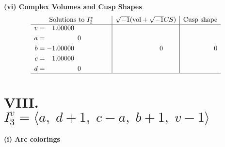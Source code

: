 \documentclass[1p]{elsarticle_modified}
\theoremstyle{definition}
\newcommand{\I}{\sqrt{-1}}
\begin{document}
\newpage\flushleft \textbf{(vi) Complex Volumes and Cusp Shapes}
$$\begin{array}{c|c|c}  
\text{Solutions to }I^v_{2}& \I (\text{vol} + \sqrt{-1}CS) & \text{Cusp shape}\\
 \hline 
\begin{aligned}
v &= \phantom{-}1.00000\phantom{ +0.000000I} \\
a &= \phantom{-0.000000 } 0 \\
b &= -1.00000\phantom{ +0.000000I} \\
c &= \phantom{-}1.00000\phantom{ +0.000000I} \\
d &= \phantom{-0.000000 } 0\end{aligned}
 & \phantom{-0.000000 } 0 & \phantom{-0.000000 } 0\\
 \hline 
 \end{array}$$\newpage\newpage\renewcommand{\arraystretch}{1}
\centering \section*{VIII. $I^v_{3}= \langle a,\;d+1,\;c- a,\;b+1,\;v-1 \rangle$}
\flushleft \textbf{(i) Arc colorings}\\
\end{document}
